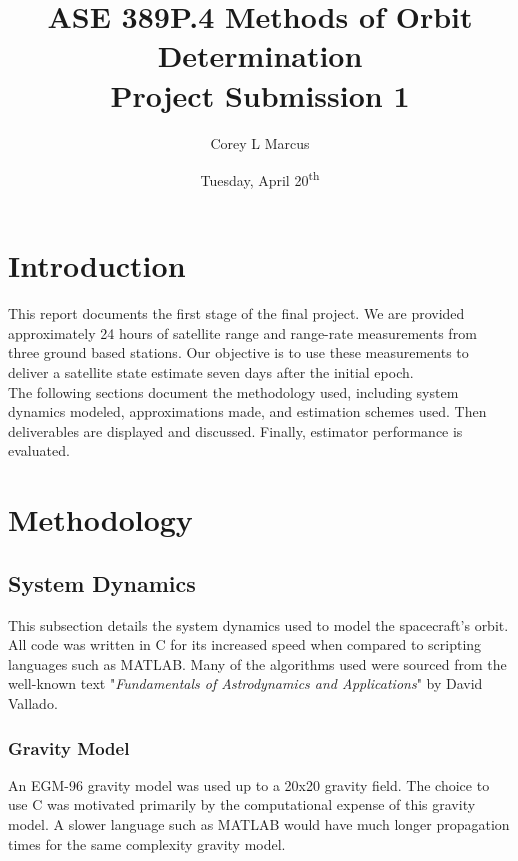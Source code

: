 \documentclass[11pt]{article}
\title{ASE 389P.4 Methods of Orbit Determination \\ Project Submission 1}
\author{Corey L Marcus} \date{Tuesday, April 20\textsuperscript{th}}
\def\CC{{C\nolinebreak[4]\hspace{-.05em}\raisebox{.4ex}{\tiny\bf ++}}}
\begin{document}
\onehalfspace
\maketitle


\section{Introduction}

This report documents the first stage of the final project. We are provided approximately 24 hours of satellite range and range-rate measurements from three ground based stations. Our objective is to use these measurements to deliver a satellite state estimate seven days after the initial epoch. \\

The following sections document the methodology used, including system dynamics modeled, approximations made, and estimation schemes used. Then deliverables are displayed and discussed. Finally, estimator performance is evaluated.

\section{Methodology}

\subsection{System Dynamics}

This subsection details the system dynamics used to model the spacecraft's orbit. All code was written in {\CC} for its increased speed when compared to scripting languages such as MATLAB. Many of the algorithms used were sourced from the well-known text "\textit{Fundamentals of Astrodynamics and Applications}" by David Vallado.

\subsubsection{Gravity Model}

An EGM-96 gravity model was used up to a 20x20 gravity field. The choice to use {\CC} was motivated primarily by the computational expense of this gravity model. A slower language such as MATLAB would have much longer propagation times for the same complexity gravity model.
\end{document}
